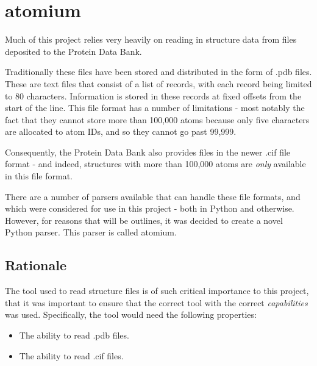 



\chapter{atomium} %


Much of this project relies very heavily on reading in structure data from files deposited to the Protein Data Bank.

Traditionally these files have been stored and distributed in the form of .pdb files. These are text files that consist of a list of records, with each record being limited to 80 characters. Information is stored in these records at fixed offsets from the start of the line. This file format has a number of limitations - most notably the fact that they cannot store more than 100,000 atoms because only five characters are allocated to atom IDs, and so they cannot go past 99,999.

Consequently, the Protein Data Bank also provides files in the newer .cif file format - and indeed, structures with more than 100,000 atoms are \emph{only} available in this file format.

There are a number of parsers available that can handle these file formats, and which were considered for use in this project - both in Python and otherwise. However, for reasons that will be outlines, it was decided to create a novel Python parser. This parser is called atomium.

\section{Rationale}

The tool used to read structure files is of such critical importance to this project, that it was important to ensure that the correct tool with the correct \emph{capabilities} was used. Specifically, the tool would need the following properties:

\begin{itemize}
  \item The ability to read .pdb files.
  \item The ability to read .cif files.
\end{itemize}

